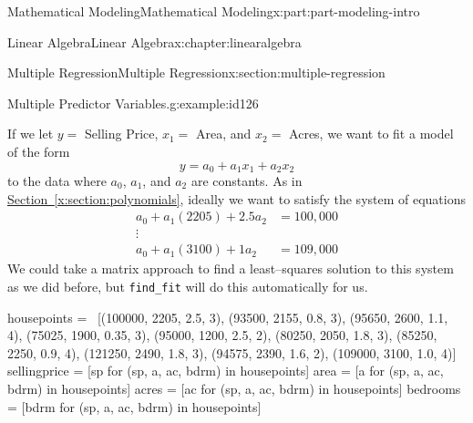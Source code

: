 \documentclass[oneside,10pt,]{book}
\newcommand{\xreffont}{\relax}
\newcommand{\mono}[1]{\texttt{#1}}
\numberwithin{equation}{section}
\begin{document}
\begin{partptx}{Mathematical Modeling}{}{Mathematical Modeling}{}{}{x:part:part-modeling-intro}
\begin{chapterptx}{Linear Algebra}{}{Linear Algebra}{}{}{x:chapter:linearalgebra}
\begin{sectionptx}{Multiple Regression}{}{Multiple Regression}{}{}{x:section:multiple-regression}
\begin{example}{Multiple Predictor Variables.}{g:example:id126}
\par
If we let \(y =\) Selling Price, \(x_1 =\) Area, and \(x_2 =\) Acres, we want to fit a model of the form%
%
\begin{equation*}
y = a_0 + a_1 x_1 + a_2 x_2
\end{equation*}
to the data where \(a_0\), \(a_1\), and \(a_2\) are constants. As in \hyperref[x:section:polynomials]{Section~{\xreffont\ref{x:section:polynomials}}}, ideally we want to satisfy the system of equations%
%
\begin{equation*}
\begin{aligned}
a_0 + a_1(2205) + 2.5a_2 &= 100,000 \\
\vdots \\
a_0 + a_1(3100) + 1a_2 &= 109,000
\end{aligned}
\end{equation*}
We could take a matrix approach to find a least–squares solution to this system as we did before, but \mono{find\_fit} will do this automatically for us.%
\begin{sageinput}
housepoints = \
[(100000, 2205, 2.5, 3), (93500, 2155, 0.8, 3), 
(95650, 2600, 1.1, 4), (75025, 1900, 0.35, 3), 
(95000, 1200, 2.5, 2), (80250, 2050, 1.8, 3),
(85250, 2250, 0.9, 4), (121250, 2490, 1.8, 3), 
(94575, 2390, 1.6, 2), (109000, 3100, 1.0, 4)]
sellingprice = [sp for (sp, a, ac, bdrm) in housepoints]
area = [a for (sp, a, ac, bdrm) in housepoints]
acres = [ac for (sp, a, ac, bdrm) in housepoints]
bedrooms = [bdrm for (sp, a, ac, bdrm) in housepoints]


\end{sageinput}
\end{example}
\end{sectionptx}
\end{chapterptx}
\end{partptx}
\end{document}
